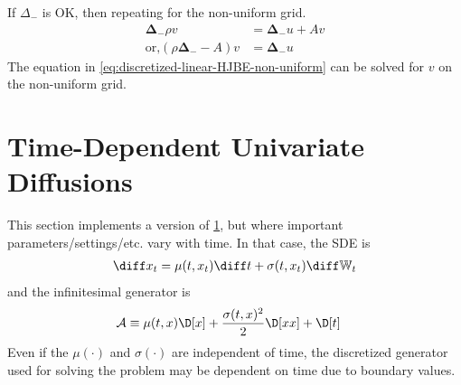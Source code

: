 \documentclass[11pt]{etk-article}
\begin{document}
If $\Delta_{-}$ is OK, then repeating for the non-uniform grid.
\begin{align}
\mathbf{\Delta}_{-} \rho v &= \mathbf{\Delta}_{-} u + A v\\
\text{or,}
( \rho \mathbf{\Delta}_{-} - A) v &= \mathbf{\Delta}_{-} u\label{eq:discretized-linear-HJBE-non-uniform}
\end{align}
The equation in \cref{eq:discretized-linear-HJBE-non-uniform} can be solved for $v$ on the non-uniform grid.

\section{Time-Dependent Univariate Diffusions}\label{sec:time-dependent-univariate-diffusion}
This section implements a version of \cref{sec:time-dependent-univariate-diffusion}, but where important parameters/settings/etc. vary with time.  In that case, the SDE is
\begin{align}
	\diff x_t = \mu(t, x_t)\diff t + \sigma(t, x_t)\diff\mathbb{W}_t\label{eq:x-t-SDE}
\end{align}
and the infinitesimal generator is 
\begin{align}
	\mathcal{A} &\equiv \mu(t,x)\D[x] + \frac{\sigma(t,x)^2}{2}\D[xx] + \D[t]\label{eq:A-generator-univariate-diffusion-t}
\end{align}
Even if the $\mu(\cdot)$ and $\sigma(\cdot)$ are independent of time, the discretized generator used for solving the problem may be dependent on time due to boundary values.



\end{document}
